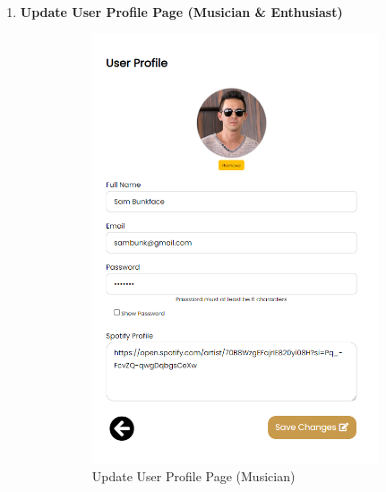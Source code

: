 \begin{enumerate}[1.]
    \item \textbf{Update User Profile Page (Musician \& Enthusiast)}
    \begin{figure}[h]
        \centering
        \begin{subfigure}[b]{0.4\textwidth}
            \centering
            \includegraphics[width=\textwidth]{mainmatter/images/frontend/ss/User Profile2 (Musician-Enthusiast).png}
            \caption{Update User Profile Page (Musician)}
            \label{fig:sub1}
        \end{subfigure}
        \hspace{0.05\textwidth}
        \begin{subfigure}[b]{0.4\textwidth}
            \centering

\end{subfigure}
\end{figure}
\end{enumerate}
